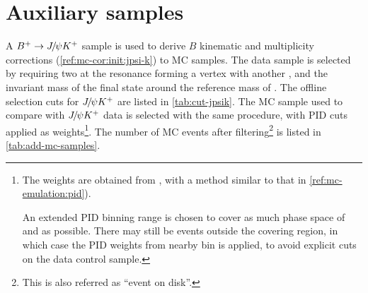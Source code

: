 \section{Auxiliary samples}
\label{ref:sel:aux}

A ${{{B}^+}} \rightarrow {\ensuremath{{J\mskip -3mu/\mskip -2mu\psi}}} {\ensuremath{{K}^+}}$ sample is used to derive $B$ kinematic and
multiplicity corrections
(\cref{ref:mc-cor:init:jpsi-k})
to MC samples.
The data sample is selected by requiring
two \muon at the \jpsi resonance forming a vertex with another \kaon,
and the invariant mass of the \mup\mun\Kp final state around the reference mass
of \Bp.
The offline selection cuts for ${{J\mskip -3mu/\mskip -2mu\psi}}{{K}^+}$ are listed in
\cref{tab:cut-jpsik}.
The MC sample used to compare with ${{J\mskip -3mu/\mskip -2mu\psi}} {{K}^+}$ data is selected with the same
procedure, with PID cuts applied as weights\footnote{
    The weights are obtained from \pidcalib, with a method similar to that in
    \cref{ref:mc-emulation:pid}).

    An extended PID binning range is chosen to cover as much phase space of
    \kaon and \muon as possible.
    There may still be events outside the covering region, in which case the PID
    weights from nearby bin is applied,
    to avoid explicit cuts on the \jpsi\kaon data control sample.
}.
The number of MC events after filtering\footnote{
    This is also referred as ``event on disk''.
} is listed in \cref{tab:add-mc-samples}.

